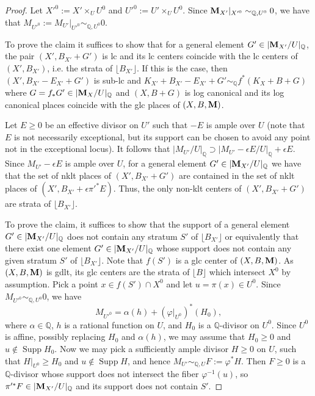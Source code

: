 \documentclass[11pt]{amsart}
\numberwithin{equation}{section}
\newcommand{\Mm}{{\bf{M}}}
\newcommand{\Qq}{\mathbb{Q}}
\newcommand{\Supp}{\operatorname{Supp}}
\theoremstyle{definition}
\theoremstyle{definition}
\theoremstyle{definition}
\begin{document}
\begin{proof}
Let $X'^0:=X'\times_UU^0$ and $U'^0:=U'\times_UU^0$. Since $\Mm_{X'}|_{X'^0}\sim _{\Qq,U^0}0$, we have that $M_{U'^0}:=M_{U'}|_{U'^0}\sim_{\Qq,U^0}0$.


To prove the claim it suffices to show that for a general element $G'\in |\Mm _{X'}/U|_\Qq$, the pair 
$(X',B_{X'}+G')$ is lc and its lc centers coincide with the lc centers of $(X',B_{X'})$, i.e. the strata of $\lfloor B_{X'}\rfloor$.  If this is the case, then $(X',B_{X'}-E_{X'}+G')$ is sub-lc and $K_{X'}+B_{X'}-E_{X'}+G'\sim _\Qq f^*(K_X+B+G)$ where $G=f_* G'\in |\Mm _{X}/U|_\Qq$ and $(X,B+G)$ is log canonical and its log canonical places coincide with the glc places of $(X,B,\Mm)$.

Let $E\geq 0$ be an effective divisor on $U'$ such that $-E$ is ample over $U$ (note that $E$ is not necessarily exceptional, but its support can be chosen to avoid any point not in the exceptional locus). It follows that $|M_{U'}/U|_\Qq\supset |M_{U'}-\epsilon E/U|_\Qq+\epsilon E$.
Since $M_{U'}-\epsilon E$ is ample over $U$, for a general element $G'\in |\Mm _{X'}/U|_\Qq$ 
we have that 
the set of nklt places of $(X',B_{X'}+G')$ are contained in the set of nklt places of $(X',B_{X'}+\epsilon \pi '^*E)$. Thus, the only non-klt centers of $(X',B_{X'}+G')$ are strata of $\lfloor B_{X'} \rfloor$. 

To prove the claim, it suffices to show that the support of a general element $G'\in |\Mm _{X'}/U|_\Qq$ does not contain any stratum $S'$ of $\lfloor B_{X'} \rfloor$ or equivalently that there exist one  element $G'\in |\Mm _{X'}/U|_\Qq$ whose support does not contain any given stratum $S'$ of $\lfloor B_{X'} \rfloor$. Note that $f(S')$ is a glc center of $(X,B,\Mm)$. As $(X,B,\Mm)$ is gdlt, its glc centers are the strata of $\lfloor B\rfloor$ which intersect $X^0$ by assumption. Pick a point $x\in f(S')\cap X^0$ and let $u=\pi (x)\in U^0$. Since $M_{U'^0}\sim _{\Qq ,U^0}0$, we have $$M_{U'^0}=\alpha(h)+(\varphi|_{U^0})^*(H_0),$$
where $\alpha\in\mathbb Q$, $h$ is a rational function on $U$, and $H_0$ is a $\Qq$-divisor on $U^0$. Since $U^0$ is affine, possibly replacing $H_0$ and $\alpha(h)$, we may assume that $H_0\geq 0$ and $u\not\in\Supp H_0$. Now we may pick a sufficiently ample divisor $H\geq 0$ on $U$, such that $H|_{U^0}\geq H_0$ and $u\not\in\Supp H$, and hence $M_{U'}\sim_{\Qq,U}F:=\varphi^*H$. Then $F\geq 0$ is a $\Qq$-divisor whose support does not intersect the fiber $\varphi^{-1}(u)$, so $\pi '^*F \in |\Mm_{X'}/U|_\Qq$ and its support does not contain $S'$.
\end{proof}
\end{document}
